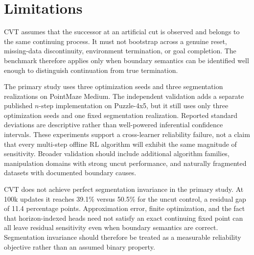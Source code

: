 \section{Limitations}

CVT assumes that the successor at an artificial cut is observed and belongs to the same continuing process. It must not bootstrap across a genuine reset, missing-data discontinuity, environment termination, or goal completion. The benchmark therefore applies only when boundary semantics can be identified well enough to distinguish continuation from true termination.

The primary study uses three optimization seeds and three segmentation realizations on PointMaze Medium. The independent validation adds a separate published $n$-step implementation on Puzzle-4x5, but it still uses only three optimization seeds and one fixed segmentation realization. Reported standard deviations are descriptive rather than well-powered inferential confidence intervals. These experiments support a cross-learner reliability failure, not a claim that every multi-step offline RL algorithm will exhibit the same magnitude of sensitivity. Broader validation should include additional algorithm families, manipulation domains with strong uncut performance, and naturally fragmented datasets with documented boundary causes.

CVT does not achieve perfect segmentation invariance in the primary study. At 100k updates it reaches 39.1\% versus 50.5\% for the uncut control, a residual gap of 11.4 percentage points. Approximation error, finite optimization, and the fact that horizon-indexed heads need not satisfy an exact continuing fixed point can all leave residual sensitivity even when boundary semantics are correct. Segmentation invariance should therefore be treated as a measurable reliability objective rather than an assumed binary property.
